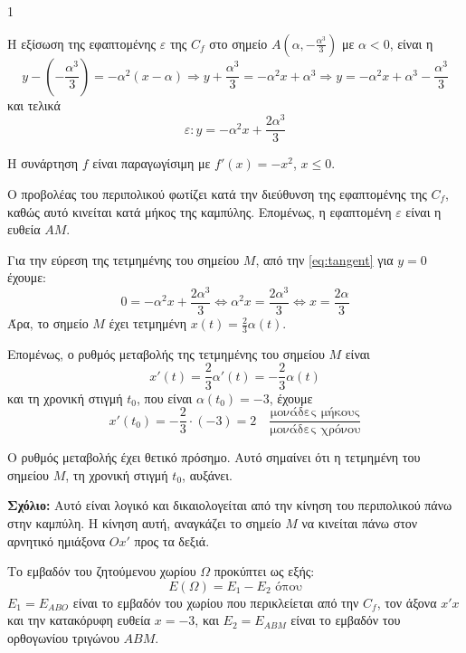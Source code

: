 \begin{ylh}{1}
    \item [Ύλη από εικόνα]
\end{ylh}
Η εξίσωση της εφαπτομένης $\varepsilon$ της $C_f$ στο σημείο $Α\left(\alpha, -\frac{\alpha^3}{3}\right)$ με $\alpha < 0$, είναι η
\[
y - \left(-\frac{\alpha^3}{3}\right) = -\alpha^2(x - \alpha) \Rightarrow y + \frac{\alpha^3}{3} = -\alpha^2 x + \alpha^3 \Rightarrow y = -\alpha^2 x + \alpha^3 - \frac{\alpha^3}{3}
\]
και τελικά
\begin{equation}\label{eq:tangent}
\varepsilon: y = -\alpha^2 x + \frac{2\alpha^3}{3}
\end{equation}

\begin{alist}
    \item [α)] Η συνάρτηση $f$ είναι παραγωγίσιμη με $f'(x) = -x^2$, $x \le 0$.
    \item [β)]
    \begin{rlist}
        \item [i.] Ο προβολέας του περιπολικού φωτίζει κατά την διεύθυνση της εφαπτομένης της $C_f$, καθώς αυτό κινείται κατά μήκος της καμπύλης. Επομένως, η εφαπτομένη $\varepsilon$ είναι η ευθεία $AM$.

        Για την εύρεση της τετμημένης του σημείου $M$, από την \eqref{eq:tangent} για $y = 0$ έχουμε:
        \[
        0 = -\alpha^2 x + \frac{2\alpha^3}{3} \Leftrightarrow \alpha^2 x = \frac{2\alpha^3}{3} \Leftrightarrow x = \frac{2\alpha}{3}
        \]
        Άρα, το σημείο $M$ έχει τετμημένη $x(t) = \frac{2}{3} \alpha(t)$.

        Επομένως, ο ρυθμός μεταβολής της τετμημένης του σημείου $M$ είναι
        \[
        x'(t) = \frac{2}{3} \alpha'(t) = -\frac{2}{3} \alpha(t)
        \]
        και τη χρονική στιγμή $t_0$, που είναι $\alpha(t_0) = -3$, έχουμε
        \[
        x'(t_0) = -\frac{2}{3} \cdot (-3) = 2 \quad \frac{\text{μονάδες μήκους}}{\text{μονάδες χρόνου}}
        \]

        \item [ii.] Ο ρυθμός μεταβολής έχει θετικό πρόσημο. Αυτό σημαίνει ότι η τετμημένη του σημείου $M$, τη χρονική στιγμή $t_0$, αυξάνει.

        \textbf{Σχόλιο:} Αυτό είναι λογικό και δικαιολογείται από την κίνηση του περιπολικού πάνω στην καμπύλη. Η κίνηση αυτή, αναγκάζει το σημείο $M$ να κινείται πάνω στον αρνητικό ημιάξονα $Ox'$ προς τα δεξιά.
    \end{rlist}
    \item [γ)] Το εμβαδόν του ζητούμενου χωρίου $\Omega$ προκύπτει ως εξής:
    \[
    E(\Omega) = E_1 - E_2 \text{ όπου}
    \]
    $E_1 = E_{ABO}$ είναι το εμβαδόν του χωρίου που περικλείεται από την $C_f$, τον άξονα $x'x$ και την κατακόρυφη ευθεία $x = -3$, και
    $E_2 = E_{ABM}$ είναι το εμβαδόν του ορθογωνίου τριγώνου $ABM$.
\end{alist}

